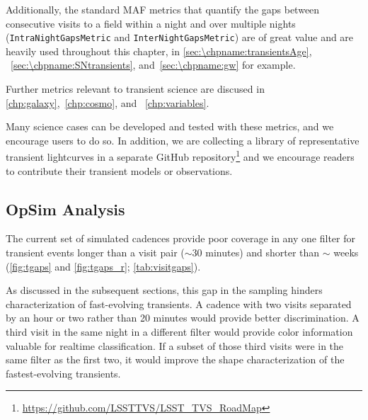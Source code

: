 Additionally, the standard MAF metrics
that quantify the gaps between consecutive visits to
a field within a night and over multiple nights
(\texttt{IntraNightGapsMetric} and \texttt{InterNightGapsMetric})
are of great value and are
heavily used throughout this chapter, in \autoref{sec:\chpname:transientsAge},
~\autoref{sec:\chpname:SNtransients}, and~\autoref{sec:\chpname:gw} for example.

Further metrics relevant to transient science are discused in \autoref{chp:galaxy},~\autoref{chp:cosmo}, and ~\autoref{chp:variables}.

Many science cases can be developed and tested with these metrics, and we
encourage users to do so. In addition, we are collecting a library of representative transient lightcurves in a separate GitHub repository\footnote{\url{https://github.com/LSSTTVS/LSST_TVS_RoadMap}} and we encourage readers to contribute their transient models or observations.



\subsection{OpSim Analysis}
\label{sec:\chpname:analysis}

The current set of simulated cadences
provide poor coverage in any one
filter for transient events longer than a visit pair ($\sim$30
minutes) and shorter than $\sim$ weeks (\autoref{fig:tgaps} and
\autoref{fig:tgaps_r}; \autoref{tab:visitgaps}).

As discussed in the subsequent sections, this
gap in the sampling hinders characterization of fast-evolving
transients.  A cadence with two visits separated by an hour or two rather
than 20 minutes would provide better discrimination.  A third visit in the
same night in a different filter would provide
color information valuable for realtime classification.
If a subset of those third
visits were in the same filter as the first two, it would improve the shape
characterization of the fastest-evolving transients.

